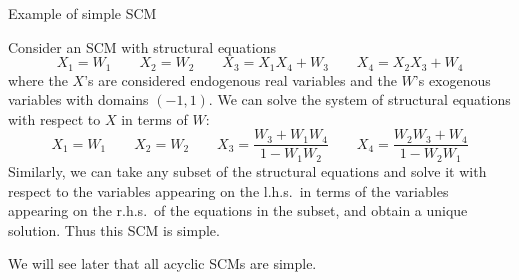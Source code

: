 \begin{frame}{Example of simple SCM}
\begin{example}
Consider an SCM with structural equations
$$X_1 = W_1 \qquad X_2 = W_2 \qquad X_3 = X_1 X_4 + W_3 \qquad X_4 = X_2 X_3 + W_4 $$
where the $X$'s are considered endogenous real variables and the $W$'s exogenous variables with domains $(-1,1)$.
We can solve the system of structural equations with respect to $X$ in terms of $W$:
$$X_1 = W_1 \qquad X_2 = W_2 \qquad X_3 = \frac{W_3 + W_1 W_4}{1 - W_1 W_2} \qquad X_4 = \frac{W_2 W_3 + W_4}{1 - W_2 W_1}$$
Similarly, we can take any subset of the structural equations and solve it with respect to the variables appearing on the l.h.s.\ in terms of the variables appearing on the r.h.s.\ of the equations in the subset, and obtain a unique solution. Thus this SCM is simple.
\end{example}
We will see later that all acyclic SCMs are simple.
\end{frame}


